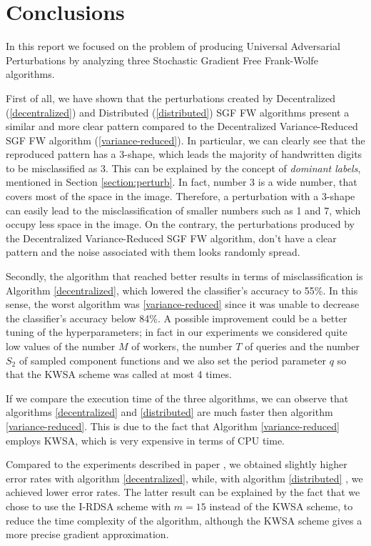\section{Conclusions}
In this report we focused on the problem of producing Universal Adversarial Perturbations by analyzing three
Stochastic Gradient Free Frank-Wolfe algorithms.

First of all, we have shown that the perturbations created by Decentralized (\ref{decentralized}) and Distributed (\ref{distributed})
SGF FW algorithms present a similar and more clear pattern compared to the Decentralized Variance-Reduced SGF FW
algorithm (\ref{variance-reduced}). In particular, we can clearly see that the reproduced pattern has a 3-shape, which
leads the majority of handwritten digits to be misclassified as 3. This can be explained by the concept of \textit{dominant labels},
mentioned in Section \ref{section:perturb}. In fact, number 3 is a wide number, that covers most of the space in the image. Therefore, a
perturbation with a 3-shape can easily lead to the misclassification of smaller numbers such as 1 and 7, which occupy
less space in the image. On the contrary, the perturbations produced by the Decentralized Variance-Reduced SGF FW algorithm,
don't have a clear pattern and the noise associated with them looks randomly spread.

Secondly, the algorithm that reached better results in terms of misclassification is Algorithm \ref{decentralized},
which lowered the classifier's accuracy to 55\%. In this sense, the worst algorithm was \ref{variance-reduced} since
it was unable to decrease the classifier's accuracy below 84\%. A possible improvement could be a better tuning of the hyperparameters; in fact in our experiments we considered quite low values of the number $M$ of workers, the number $T$ of queries and the number $S_2$ of sampled component functions and we also set the period parameter $q$ so that the KWSA scheme was called at most 4 times. 

If we compare the execution time of the three algorithms, we can observe that algorithms \ref{decentralized} and \ref{distributed}
are much faster then algorithm \ref{variance-reduced}. This is due to the fact that Algorithm \ref{variance-reduced}
employs KWSA, which is very expensive in terms of CPU time.

Compared to the experiments described in paper \cite{A3}, we obtained slightly higher error rates with algorithm
\ref{decentralized}, while, with algorithm \ref{distributed} , we achieved lower error rates. The latter result can be
explained by the fact that we chose to use the I-RDSA scheme with $m=15$ instead of the KWSA scheme, to reduce the time
complexity of the algorithm, although the KWSA scheme gives a more precise gradient approximation. 

